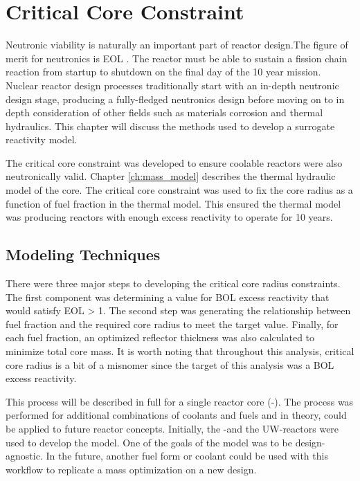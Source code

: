\chapter{Critical Core Constraint}\label{ch:crit_radius}
Neutronic viability is naturally an important part of reactor design.The figure of merit
for neutronics is EOL \keff. The reactor must be able to sustain a fission
chain reaction from startup to shutdown on the final day of the 10 year
mission. Nuclear reactor design processes traditionally start with an in-depth
neutronic design stage, producing a fully-fledged neutronics design before
moving on to in depth consideration of other fields such as materials corrosion
and thermal hydraulics. This chapter will discuss the methods
used to develop a surrogate reactivity model.

The critical core constraint was developed to ensure coolable reactors were also
neutronically valid. Chapter \ref{ch:mass_model} describes the thermal hydraulic
model of the core. The critical core constraint was used to fix the core radius
as a function of fuel fraction in the thermal model. This ensured the thermal
model was producing reactors with enough excess reactivity to operate for 10 years.

\section{Modeling Techniques}
There were three major steps to developing the critical core radius
constraints. The first component was determining a value for BOL excess reactivity that would satisfy
EOL \keff > 1. The second step was generating the relationship between fuel fraction and the
required core radius to meet the target \keff value. Finally, for each fuel fraction, an
optimized reflector thickness was also calculated to minimize total core mass.
It is worth noting that throughout this analysis, critical core radius is a
bit of a misnomer since the target of this analysis was a BOL excess
reactivity.

This process will be described in full for a single reactor core (\uox-\codiox). The process
was performed for additional combinations of coolants and fuels and in theory,
could be applied to future reactor concepts. Initially, the \uox-\codiox and the
UW-\codiox reactors were used to develop the model. One of the goals of the
model was to be design-agnostic. In the future, another fuel form or coolant could be used
with this workflow to replicate a mass optimization on a new design.

